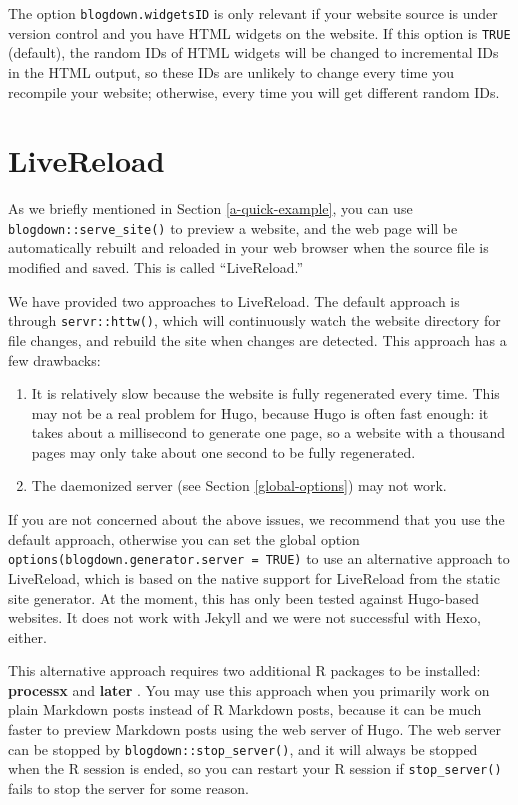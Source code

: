 \documentclass[12pt,]{krantz}
\theoremstyle{definition}
\theoremstyle{definition}
\theoremstyle{definition}
\theoremstyle{remark}
\begin{document}
The option \texttt{blogdown.widgetsID} is only relevant if your website
source is under version control and you have HTML widgets on the
website. If this option is \texttt{TRUE} (default), the random IDs of
HTML widgets will be changed to incremental IDs in the HTML output, so
these IDs are unlikely to change every time you recompile your website;
otherwise, every time you will get different random IDs.

\hypertarget{livereload}{%
\section{LiveReload}\label{livereload}}

As we briefly mentioned in Section
\ref{a-quick-example}, you can use \texttt{blogdown::serve\_site()} to
preview a website, and the web page will be automatically rebuilt and
reloaded in your web browser when the source file is modified and saved.
This is called ``LiveReload.''

We have provided two approaches to LiveReload. The default approach is
through \texttt{servr::httw()}, which will continuously watch the
website directory for file changes, and rebuild the site when changes
are detected. This approach has a few drawbacks:

\begin{enumerate}
\def\labelenumi{\arabic{enumi}.}
\item
  It is relatively slow because the website is fully regenerated every
  time. This may not be a real problem for Hugo, because Hugo is often
  fast enough: it takes about a millisecond to generate one page, so a
  website with a thousand pages may only take about one second to be
  fully regenerated.
\item
  The daemonized server (see Section \ref{global-options}) may not work.
\end{enumerate}

If you are not concerned about the above issues, we recommend that you
use the default approach, otherwise you can set the global option
\texttt{options(blogdown.generator.server\ =\ TRUE)} to use an
alternative approach to LiveReload, which is based on the native support
for LiveReload from the static site generator. At the moment, this has
only been tested against Hugo-based websites. It does not work with
Jekyll and we were not successful with Hexo, either.

This alternative approach requires two additional R packages to be
installed: \textbf{processx} \citep{R-processx} and \textbf{later}
\citep{R-later}. You may use this approach when you primarily work on
plain Markdown posts instead of R Markdown posts, because it can be much
faster to preview Markdown posts using the web server of Hugo. The web
server can be stopped by \texttt{blogdown::stop\_server()}, and it will
always be stopped when the R session is ended, so you can restart your R
session if \texttt{stop\_server()} fails to stop the server for some
reason.
\end{document}
